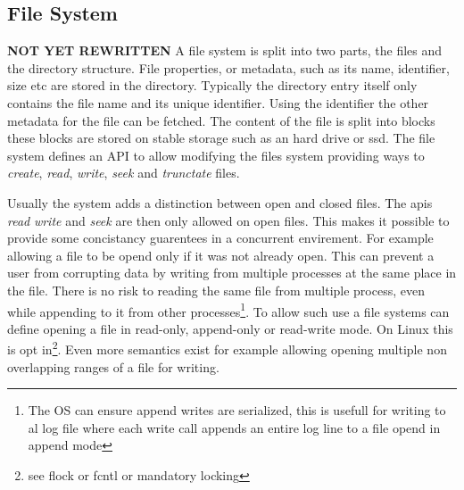 \subsection{File System}
\textbf{NOT YET REWRITTEN}
A file system is split into two parts, the files and the directory structure. File properties, or metadata, such as its name, identifier, size etc are stored in the directory. Typically the directory entry itself only contains the file name and its unique identifier. Using the identifier the other metadata for the file can be fetched. The content of the file is split into blocks these blocks are stored on stable storage such as an hard drive or ssd. The file system defines an API to allow modifying the files system providing ways to \textit{create}, \textit{read}, \textit{write}, \textit{seek} and \textit{trunctate} files. 

Usually the system adds a distinction between open and closed files. The apis \textit{read} \textit{write} and \textit{seek} are then only allowed on open files. This makes it possible to provide some concistancy guarentees in a concurrent envirement. For example allowing a file to be opend only if it was not already open. This can prevent a user from corrupting data by writing from multiple processes at the same place in the file. There is no risk to reading the same file from multiple process, even while appending to it from other processes\footnote{The OS can ensure append writes are serialized, this is usefull for writing to al log file where each write call appends an entire log line to a file opend in append mode}. To allow such use a file systems can define opening a file in read-only, append-only or read-write mode. On Linux this is opt in\footnote{see flock or fcntl or mandatory locking}. Even more semantics exist for example allowing opening multiple non overlapping ranges of a file for writing. 

